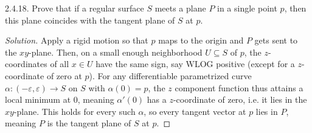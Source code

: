\documentclass[10pt]{scrartcl}
\providecommand{\eps}{\varepsilon}
\newenvironment{soln}{\begin{proof}[Solution]}{\end{proof}}
\begin{document}
\begin{problem*}2.4.18.
	Prove that if a regular surface $S$ meets a plane $P$ in a single point $p$,
	then this plane coincides with the tangent plane of $S$ at $p$.
\end{problem*}

\begin{soln}
	Apply a rigid motion so that $p$ maps to the origin
	and $P$ gets sent to the $xy$-plane.
	Then, on a small enough neighborhood $U\subseteq S$ of $p$,
	the $z$-coordinates of all $x\in U$ have the same sign, say WLOG positive
	(except for a $z$-coordinate of zero at $p$).
	For any differentiable parametrized curve $\alpha\colon(-\eps,\eps)\to S$
	on $S$ with $\alpha(0) = p$, the $z$ component function thus
	attains a local minimum at $0$, meaning $\alpha'(0)$ has a $z$-coordinate
	of zero, i.e. it lies in the $xy$-plane.
	This holds for every such $\alpha$, so every tangent vector at $p$
	lies in $P$, meaning $P$ is the tangent plane of $S$ at $p$.
\end{soln}
\end{document}
